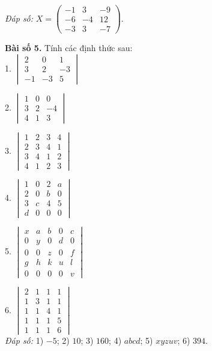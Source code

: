 \textit{Đáp số:} \(X = \begin{pmatrix}
-1 & 3 & -9 \\
-6 & -4 & 12 \\
-3 & 3 & -7
\end{pmatrix}\).

\textbf{Bài số 5.} Tính các định thức sau:\\

1. \(\begin{vmatrix}
2 & 0 & 1 \\
3 & 2 & -3 \\
-1 & -3 & 5
\end{vmatrix}\)\\
\vspace*{0.5cm}

2. \(\begin{vmatrix}
1 & 0 & 0 \\
3 & 2 & -4 \\
4 & 1 & 3
\end{vmatrix}\)\\
\vspace*{0.5cm}

3. \(\begin{vmatrix}
1 & 2 & 3 & 4 \\
2 & 3 & 4 & 1 \\
3 & 4 & 1 & 2 \\
4 & 1 & 2 & 3
\end{vmatrix}\)\\
\vspace*{0.5cm}

4. \(\begin{vmatrix}
1 & 0 & 2 & a \\
2 & 0 & b & 0 \\
3 & c & 4 & 5 \\
d & 0 & 0 & 0
\end{vmatrix}\)\\
\vspace*{0.5cm}

5. \(\begin{vmatrix}
x & a & b & 0 & c \\
0 & y & 0 & d & 0 \\
0 & 0 & z & 0 & f \\
g & h & k & u & l \\
0 & 0 & 0 & 0 & v
\end{vmatrix}\)
\vspace*{0.5cm}

6. \(\begin{vmatrix}
2 & 1 & 1 & 1 \\
1 & 3 & 1 & 1 \\
1 & 1 & 4 & 1 \\
1 & 1 & 1 & 5 \\
1 & 1 & 1 & 6
\end{vmatrix}\)\\
\vspace*{0.5cm}
\textit{Đáp số:}
1) \(-5\);
2) \(10\);
3) \(160\);
4) \(abcd\);
5) \(xyzuv\);
6) \(394\).

